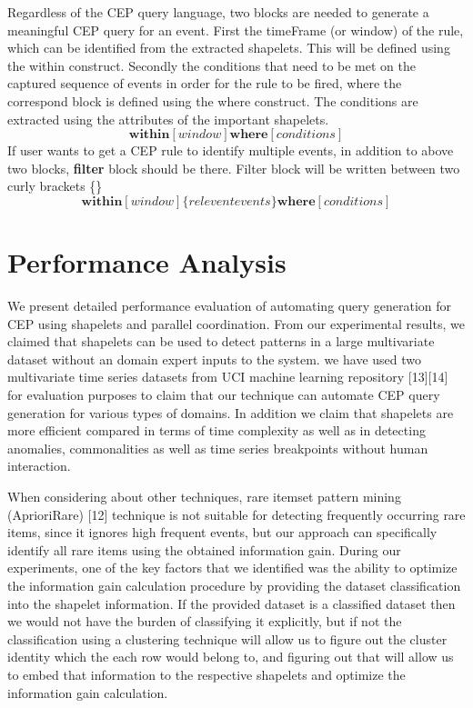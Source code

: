 \documentclass[conference]{IEEEtran}  %
\begin{document}
Regardless of the CEP query language, two blocks are needed to generate a meaningful CEP query for an event. First the timeFrame (or window) of the rule, which can be identified from the extracted shapelets. This will be defined using the within construct. Secondly the conditions that need to be met on the captured sequence of events in order for the rule to be fired, where the correspond block is defined using the where construct. The conditions are extracted using the attributes of the important shapelets.
\begin{equation}
\textbf{within}[window] \textbf{where}[conditions]
\end{equation}
If user wants to get a CEP rule to identify multiple events, in addition to above two blocks, \textbf{filter} block should be there. Filter block will be written between two curly brackets \{\}
\begin{equation}
\textbf{within}[window] \{relevent events\} \textbf{where}[conditions]
\end{equation}


\section{Performance Analysis}
We present detailed performance evaluation of automating query generation for CEP using shapelets and parallel coordination. From our experimental results, we claimed that shapelets can be used to detect patterns in a large multivariate dataset without an domain expert inputs to the system. we have used two multivariate time series datasets from UCI machine learning repository [13][14] for evaluation purposes to claim that our technique can automate CEP query generation for various types of domains. In addition we claim that shapelets are more efficient compared in terms of time complexity as well as in detecting anomalies, commonalities as well as time series breakpoints without human interaction.

When considering about other techniques, rare itemset pattern mining (AprioriRare) [12] technique is not suitable for detecting frequently occurring rare items, since it ignores high frequent events, but our approach can specifically identify all rare items using the obtained information gain. During our experiments, one of the key factors that we identified was the ability to optimize the information gain calculation procedure by providing the dataset classification into the shapelet information. If the provided dataset is a classified dataset then we would not have the burden of classifying it explicitly, but if not the classification using a clustering technique will allow us to figure out the cluster identity which the each row would belong to, and figuring out that will allow us to embed that information to the respective shapelets and optimize the information gain calculation. 
\end{document}
